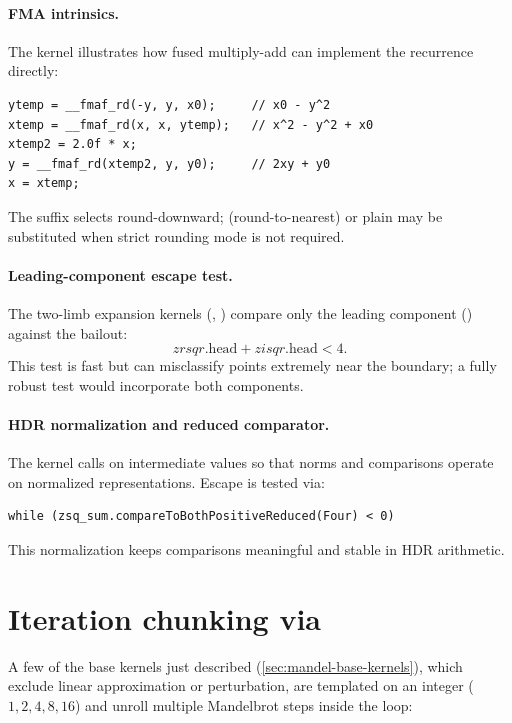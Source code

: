\paragraph{FMA intrinsics.}
The  kernel illustrates how fused multiply-add can
implement the recurrence directly:
\begin{lstlisting}
ytemp = __fmaf_rd(-y, y, x0);     // x0 - y^2
xtemp = __fmaf_rd(x, x, ytemp);   // x^2 - y^2 + x0
xtemp2 = 2.0f * x;
y = __fmaf_rd(xtemp2, y, y0);     // 2xy + y0
x = xtemp;
\end{lstlisting}
The  suffix selects round-downward;  (round-to-nearest)
or plain  may be substituted when strict rounding mode is not required.

\paragraph{Leading-component escape test.}
The two-limb expansion kernels (,
) compare only the leading component
() against the bailout:
\[
  zrsqr.\mathrm{head} + zisqr.\mathrm{head} < 4.
\]
This test is fast but can misclassify points extremely near the boundary; a fully
robust test would incorporate both components.

\paragraph{HDR normalization and reduced comparator.}
The  kernel calls  on intermediate
values so that norms and comparisons operate on normalized representations.
Escape is tested via:
\begin{lstlisting}
while (zsq_sum.compareToBothPositiveReduced(Four) < 0)
\end{lstlisting}
This normalization keeps comparisons meaningful and stable in HDR arithmetic.


\section{Iteration chunking via }
\label{sec:chunking}

A few of the base kernels just described (\cref{sec:mandel-base-kernels}), which exclude linear approximation or
perturbation, are templated on an integer 
(\(1,2,4,8,16\)) and unroll multiple Mandelbrot steps inside the loop:

